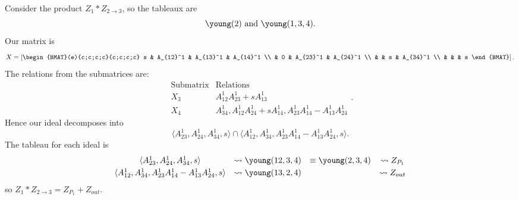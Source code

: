 \documentclass{article} %
\begin{document}
\begin{example}
Consider the product $Z_1 * Z_{2 \rightarrow 3}$, so the tableaux are 
\[
\young(2) \text{ and } \young(1,3,4).
\]
Our matrix is 
\[
X = \left[\begin{BMAT}(e){c;c;c;c}{c;c;c;c}
    s & A_{12}^1 & A_{13}^1 & A_{14}^1 \\
     & 0 & A_{23}^1 & A_{24}^1 \\
     & & s & A_{34}^1 \\
     & & & s
\end{BMAT}
\right].
\]
The relations from the submatrices are:
\[
\begin{array}{c|c}
    \text{Submatrix} & \text{Relations} \\ \hline
    X_3 & A_{12}^1A_{23}^1 + sA_{13}^1 \\
    X_4 & A_{34}^1, A_{12}^1A_{24}^1 + sA_{14}^1, A_{23}^1A_{14}^1 - A_{13}^1A_{24}^1
\end{array}.
\]
Hence our ideal decomposes into 
\[
\langle A_{23}^1,A_{24}^1,A_{34}^1,s \rangle \cap \langle A_{12}^1,A_{34}^1,A_{23}^1A_{14}^1 - A_{13}^1A_{24}^1,s \rangle.
\]
The tableau for each ideal is
\[\begin{array}{cccc}\vspace{1mm}
    \langle A_{23}^1,A_{24}^1,A_{34}^1,s \rangle &\leadsto \young(12,3,4) &\equiv \young(2,3,4) &\leadsto Z_{P_1} \\ 
    \langle A_{12}^1,A_{34}^1,A_{23}^1A_{14}^1 - A_{13}^1A_{24}^1,s \rangle &\leadsto \young(13,2,4) & &\leadsto Z_{out}
\end{array}
\]
so $Z_1 * Z_{2 \rightarrow 3} = Z_{P_1} + Z_{out}$.
\end{example}
\end{document}
